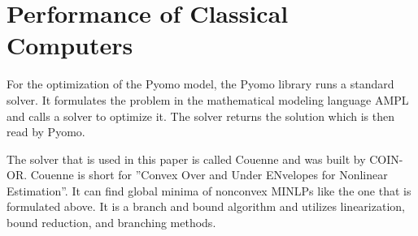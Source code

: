 \section{Performance of Classical Computers}

For the optimization of the Pyomo model, the Pyomo library runs a standard solver.
It formulates the problem in the mathematical modeling language AMPL
and calls a solver to optimize it.
The solver returns the solution which is then read by Pyomo.
\cite{PyomoAMPL}

The solver that is used in this paper is called Couenne and was built by COIN-OR.
Couenne is short for ''Convex Over and Under ENvelopes for Nonlinear Estimation''.
It can find global minima of nonconvex MINLPs like the one that is formulated above.
It is a branch and bound algorithm and utilizes linearization, bound reduction, and branching methods.
\cite{CoinorHome,CouenneRepo}


